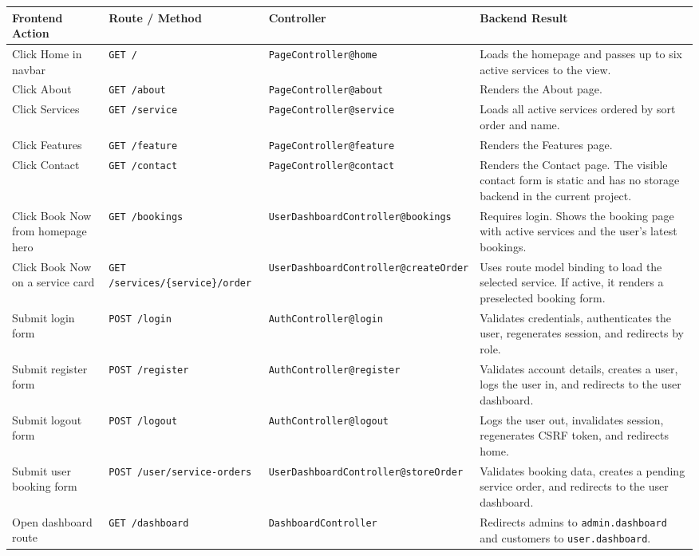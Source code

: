 \documentclass[12pt,a4paper]{report}
\begin{document}
\begin{longtable}{L{0.20\textwidth} L{0.20\textwidth} L{0.20\textwidth} L{0.30\textwidth}}
\toprule
\textbf{Frontend Action} & \textbf{Route / Method} & \textbf{Controller} & \textbf{Backend Result} \\
\midrule
\endhead
Click Home in navbar & \texttt{GET /} & \texttt{PageController@home} & Loads the homepage and passes up to six active services to the view. \\
Click About & \texttt{GET /about} & \texttt{PageController@about} & Renders the About page. \\
Click Services & \texttt{GET /service} & \texttt{PageController@service} & Loads all active services ordered by sort order and name. \\
Click Features & \texttt{GET /feature} & \texttt{PageController@feature} & Renders the Features page. \\
Click Contact & \texttt{GET /contact} & \texttt{PageController@contact} & Renders the Contact page. The visible contact form is static and has no storage backend in the current project. \\
Click Book Now from homepage hero & \texttt{GET /bookings} & \texttt{UserDashboardController@bookings} & Requires login. Shows the booking page with active services and the user's latest bookings. \\
Click Book Now on a service card & \texttt{GET /services/\{service\}/order} & \texttt{UserDashboardController@createOrder} & Uses route model binding to load the selected service. If active, it renders a preselected booking form. \\
Submit login form & \texttt{POST /login} & \texttt{AuthController@login} & Validates credentials, authenticates the user, regenerates session, and redirects by role. \\
Submit register form & \texttt{POST /register} & \texttt{AuthController@register} & Validates account details, creates a user, logs the user in, and redirects to the user dashboard. \\
Submit logout form & \texttt{POST /logout} & \texttt{AuthController@logout} & Logs the user out, invalidates session, regenerates CSRF token, and redirects home. \\
Submit user booking form & \texttt{POST /user/service-orders} & \texttt{UserDashboardController@storeOrder} & Validates booking data, creates a pending service order, and redirects to the user dashboard. \\
Open dashboard route & \texttt{GET /dashboard} & \texttt{DashboardController} & Redirects admins to \texttt{admin.dashboard} and customers to \texttt{user.dashboard}. \\

\end{longtable}
\end{document}
